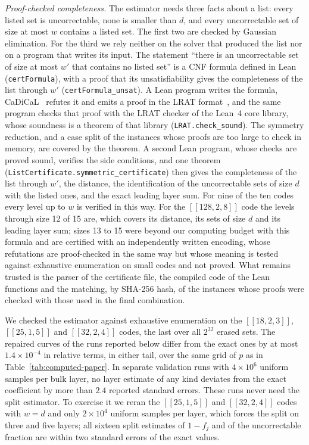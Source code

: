 \documentclass[11pt]{article}
\theoremstyle{remark}
\newcommand{\lean}[1]{\texttt{#1}}
\begin{document}
\emph{Proof-checked completeness.} The estimator needs three facts about
a list: every listed set is uncorrectable, none is smaller than \(d\),
and every uncorrectable set of size at most \(w\) contains a listed set.
The first two are checked by Gaussian elimination. For the third we
rely neither on the solver that produced the list nor on a program that
writes its input. The statement ``there is an uncorrectable set of size
at most \(w'\) that contains no listed set'' is a CNF formula defined in
Lean (\lean{certFormula}), with a proof that its unsatisfiability gives
the completeness of the list through \(w'\)
(\lean{certFormula\_unsat}). A Lean program writes the formula,
CaDiCaL~\cite{biere2024cadical} refutes it and emits a proof in the LRAT
format~\cite{cruzfilipe2017lrat}, and the same program checks that proof
with the LRAT checker of the Lean~4 core library, whose soundness is a
theorem of that library (\lean{LRAT.check\_sound}). The symmetry
reduction, and a case split of the instances whose proofs are too large
to check in memory, are covered by the theorem. A second Lean program,
whose checks are proved sound, verifies the side conditions, and one
theorem (\lean{ListCertificate.symmetric\_certificate}) then gives the
completeness of the list through \(w'\), the distance, the
identification of the uncorrectable sets of size \(d\) with the listed
ones, and the exact leading layer sum.
For nine of the ten codes every level up to \(w\) is verified in this way. For the \([[128,2,8]]\) code the levels through size 12 of 15 are, which covers its distance, its sets of size \(d\) and its leading layer sum; sizes 13 to 15 were beyond our computing budget with this formula and are certified with an independently written encoding, whose refutations are proof-checked in the same way but whose meaning is tested against exhaustive enumeration on small codes and not proved.
What remains trusted is the parser of the certificate file, the compiled
code of the Lean functions and the matching, by SHA-256 hash, of the
instances whose proofs were checked with those used in the final
combination.


We checked the estimator against exhaustive enumeration on the
\([[18,2,3]]\), \([[25,1,5]]\) and \([[32,2,4]]\) codes, the last over
all \(2^{32}\) erased sets. The repaired curves of the runs reported
below differ from the exact ones by at most \(1.4\times10^{-4}\) in
relative terms, in either tail, over the same grid of \(p\) as in
Table~\ref{tab:computed-paper}. In separate validation runs with
\(4\times10^6\) uniform samples per bulk layer, no layer estimate of any
kind deviates from the exact coefficient by more than \(2.4\) reported
standard errors. These runs never need the split estimator. To exercise
it we reran the \([[25,1,5]]\) and \([[32,2,4]]\) codes with \(w=d\) and
only \(2\times10^4\) uniform samples per layer, which forces the
split on three and five layers; all sixteen split estimates of
\(1-f_j\) and of the uncorrectable fraction are within two standard
errors of the exact values.
\end{document}
